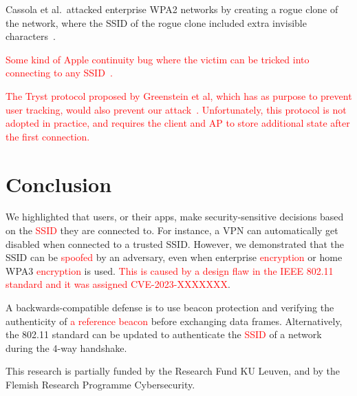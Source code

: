 \documentclass[sigconf,review,anonymous]{acmart}
\newcommand{\fourway}{\mbox{4-way}}
\DeclareRobustCommand{\red}[1]{\textcolor{red}{#1}}
\begin{document}
Cassola et al.\ attacked enterprise WPA2 networks by creating a rogue clone of the network, where the SSID of the rogue clone included extra invisible characters~\cite{cassola2013practical}.

\red{Some kind of Apple continuity bug where the victim can be tricked into connecting to any SSID~\cite{stute2021disrupting}.}

\red{The Tryst protocol proposed by Greenstein et al, which has as purpose to prevent user tracking, would also prevent our attack~\cite{greenstein2008improving}.
Unfortunately, this protocol is not adopted in practice, and requires the client and AP to store additional state after the first connection.}

\section{Conclusion}
\label{sec:conclusion}

We highlighted that users, or their apps, make security-sensitive decisions based on the \red{SSID} they are connected to.
For instance, a VPN can automatically get disabled when connected to a trusted SSID. 
However, we demonstrated that the SSID can be \red{spoofed} by an adversary, even when enterprise \red{encryption} or home WPA3 \red{encryption} is used.
\red{This is caused by a design flaw in the IEEE 802.11 standard and it was assigned CVE-2023-XXXXXXX}.

A backwards-compatible defense is to use beacon protection and verifying the authenticity of \red{a reference beacon} before exchanging data frames.
Alternatively, the 802.11 standard can be updated to authenticate the \red{SSID} of a network during the \fourway{} handshake.

\begin{acks}
This research is partially funded by the Research Fund KU Leuven, and by the Flemish Research Programme Cybersecurity.
\end{acks}




\end{document}

